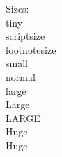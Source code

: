 \documentclass{article}
\begin{document}
Sizes:\\
{\tiny tiny }\\
{\scriptsize scriptsize}\\
{\footnotesize footnotesize}\\
{\small small}\\
{\normalsize normal}\\
{\large large}\\
{\Large Large}\\ 
{\LARGE LARGE}\\ 
{\huge Huge} \\
{\Huge Huge}\\
\end{document}
